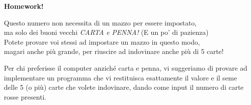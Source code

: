 \documentclass[8pt]{beamer}
\theoremstyle{plain}
\theoremstyle{definition}
\begin{document}
\begin{frame}
\begin{center}
\textbf{Homework!}
% 
% 

\bigskip

Questo numero non necessita di un mazzo per essere impostato, \\ma solo dei buoni vecchi \textit{CARTA e PENNA!} (E un po' di pazienza) \\Potete provare voi stessi ad impostare un mazzo in questo modo, \\magari anche più grande, per riuscire ad indovinare anche più di 5 carte!

\bigskip

Per chi preferisse il computer anziché carta e penna, vi suggeriamo di provare ad implementare un programma che vi restituisca esattamente il valore e il seme delle 5 (o più) carte che volete indovinare, dando come input il numero di carte rosse presenti.

\end{center}
\end{frame}




\begin{frame}

\end{frame}
\end{document}
